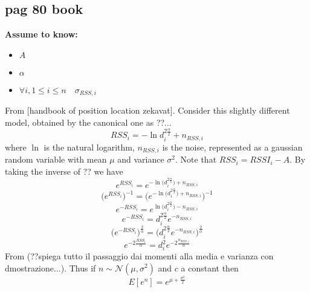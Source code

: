 \documentclass[12pt]{report}
\begin{document}
\subsection{pag 80 book}
  \begin{center}
  \textbf{Assume to know:}
  \begin{itemize}
    \centering
    \item $A$
    \item $\alpha$
    \item $\forall i , 1\leq i\leq n\quad \sigma_{RSS,i}$
  \end{itemize}
  \end{center}
From [handbook of position location zekavat]. Consider this slightly different model, obtained by the canonical one as ??...
\begin{equation}
    RSS_i=-\ln{d_i^{2\frac{\alpha}{2}}}+n_{RSS,i}
\end{equation}
where $\ln$ is the natural logarithm, $n_{RSS,i}$ is the noise, represented as a gaussian random variable with mean $\mu$ and variance $\sigma^2$. Note that $RSS_i=RSSI_i-A$. By taking the inverse of ?? we have 
\begin{equation}
    e^{RSS_i}=e^{-\ln\big(d_i^{2\frac{\alpha}{2}}\big)+n_{RSS,i}}
\end{equation}
\begin{equation}
    \bigg(e^{RSS_i}\bigg)^{-1}=\bigg(e^{-\ln\big(d_i^{2\frac{\alpha}{2}}\big)+n_{RSS,i}}\bigg)^{-1}
\end{equation}
\begin{equation}
    e^{-RSS_i}=e^{\ln\big(d_i^{2\frac{\alpha}{2}}\big)-n_{RSS,i}}
\end{equation}
\begin{equation}
    e^{-RSS_i}=d_i^{2\frac{\alpha}{2}}e^{-n_{RSS,i}}
\end{equation}
\begin{equation}
    \bigg(e^{-RSS_i}\bigg)^{\frac{2}{\alpha}}=\bigg(d_i^{2\frac{\alpha}{2}}e^{-n_{RSS,i}}\bigg)^{\frac{2}{\alpha}}
\end{equation}
\begin{equation}
    e^{-2\frac{RSS_i}{\alpha}}=d_i^2e^{-2\frac{n_{RSS,i}}{\alpha}}
\end{equation}
From \cite{Beran2011} (??spiega tutto il passaggio dai momenti alla media e varianza con dmostrazione...).  Thus if $n\sim\mathcal{N}(\mu,\sigma^2)$ and $c$ a constant then
\begin{equation}
    E[e^n]=e^{\mu+\frac{\sigma^2}{2}}
\end{equation}
\end{document}
